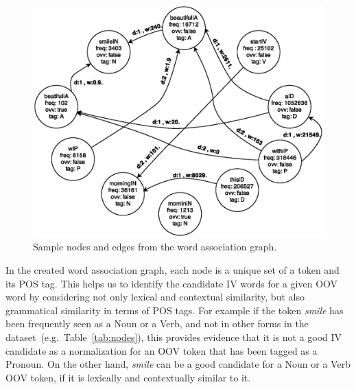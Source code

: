\documentclass[preprint,review,12pt]{elsarticle}
\begin{document}
\begin{figure}[htb]
\begin{center}
\includegraphics[scale=0.6]{fig/graph}
\caption{Sample nodes and edges from the word association graph.}
\label{fig:graph}
\end{center}
\end{figure}



In the created word association graph, each node is a unique set of a token and its POS tag. This helps us to identify the candidate IV words for a given OOV word by considering not only lexical and contextual similarity, but also grammatical similarity in terms of POS tags. For example if the token \textit{smile} has been frequently seen as a Noun or a Verb, and not in other forms in the dataset~(e.g.~Table~\ref{tab:nodes}), this provides evidence that it is not a good IV candidate as a normalization for an OOV token that has  been tagged as a Pronoun. On the other hand, \textit{smile} can be a good candidate for a Noun or a Verb OOV token, if it is lexically and contextually similar to it.
\end{document}
